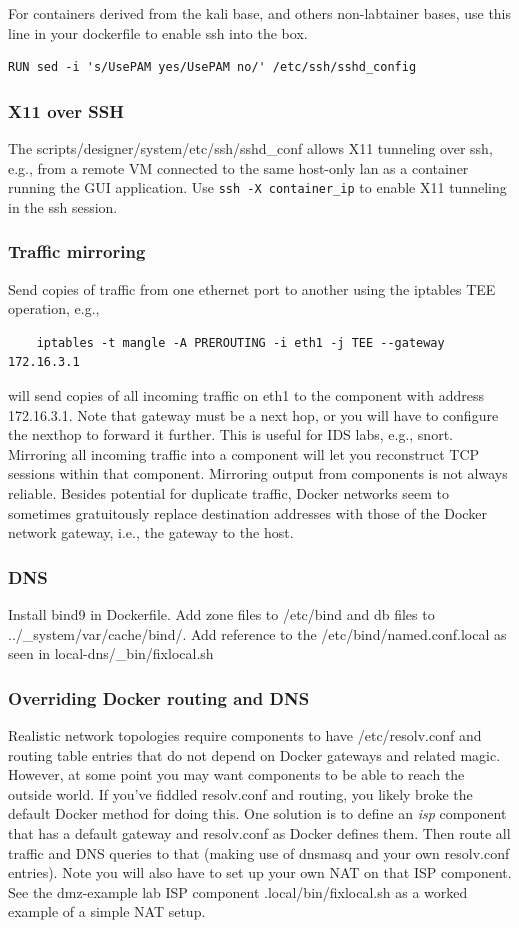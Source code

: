 \documentclass[12pt]{article}
\begin{document}
For containers derived from the kali base, and others non-labtainer bases, use this line in your dockerfile
to enable ssh into the box.
\begin{verbatim}
RUN sed -i 's/UsePAM yes/UsePAM no/' /etc/ssh/sshd_config
\end{verbatim}
\subsubsection{X11 over SSH}
The scripts/designer/system/etc/ssh/sshd\_conf allows X11 tunneling over ssh, e.g.,
from a remote VM connected to the same host-only lan as a container running the GUI
application.  Use {\tt ssh -X container\_ip} to enable X11 tunneling in the ssh session.

\subsubsection{Traffic mirroring}
Send copies of traffic from one ethernet port to another using the iptables TEE operation, e.g.,
\begin{verbatim}
    iptables -t mangle -A PREROUTING -i eth1 -j TEE --gateway 172.16.3.1
\end{verbatim}
\noindent will send copies of all incoming traffic on eth1 to the component with address 172.16.3.1.
Note that gateway must be a next hop, or you will have to configure the nexthop to forward it further.
This is useful for IDS labs, e.g., snort.  Mirroring all incoming traffic into a component will let you
reconstruct TCP sessions within that component.  Mirroring output from components is not always reliable.
Besides potential for duplicate traffic, Docker networks seem to sometimes gratuitously replace destination
addresses with those of the Docker network gateway, i.e., the gateway to the host.

\subsubsection{DNS}
Install bind9 in Dockerfile.  Add zone files to /etc/bind and db files to ../\_system/var/cache/bind/.
Add reference to the /etc/bind/named.conf.local as seen in local-dns/\_bin/fixlocal.sh

\subsubsection{Overriding Docker routing and DNS}
Realistic network topologies require components to have /etc/resolv.conf and routing
table entries that do not depend on Docker gateways and related magic.  However, at some point you may
want components to be able to reach the outside world.  If you've fiddled resolv.conf and routing,
you likely broke the default Docker method for doing this.  One solution is to 
define an \textit{isp} component that has a default gateway and resolv.conf as Docker defines them.  Then
route all traffic and DNS queries to that (making use of dnsmasq and your own resolv.conf entries).  
Note you will also have to set up your own NAT on that ISP component.  See the dmz-example lab
ISP component .local/bin/fixlocal.sh as a worked example of a simple NAT setup.
\end{document}
